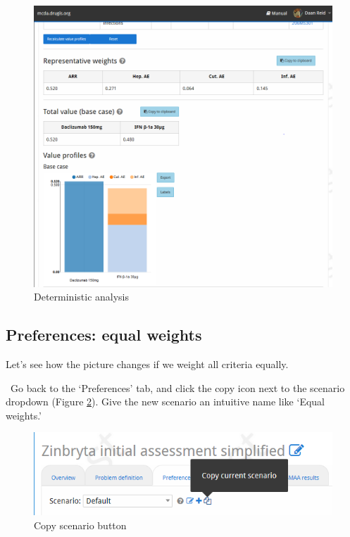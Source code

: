 \documentclass[00_mcda_tutorial.tex]{subfiles}
\begin{document}
\begin{figure}[!h]
    \centering
	\includegraphics[width=\textwidth]{fig/deterministicRanked.png}
    \caption{Deterministic analysis}
	\label{fig:deterministic_ranked}
\end{figure}

\subsection*{Preferences: equal weights}
Let’s see how the picture changes if we weight all criteria equally.
\newline

\noindent \leftpointright \, Go back to the ‘Preferences’ tab, and click the copy icon next to the scenario dropdown (Figure \ref{fig:copy_scenario}). Give the new scenario an intuitive name like ‘Equal weights.’
\newline

\begin{figure}[!h]
    \centering
	\includegraphics[width=.5\textwidth]{fig/copyScenario.png}
    \caption{Copy scenario button}
	\label{fig:copy_scenario}
\end{figure}
\end{document}
